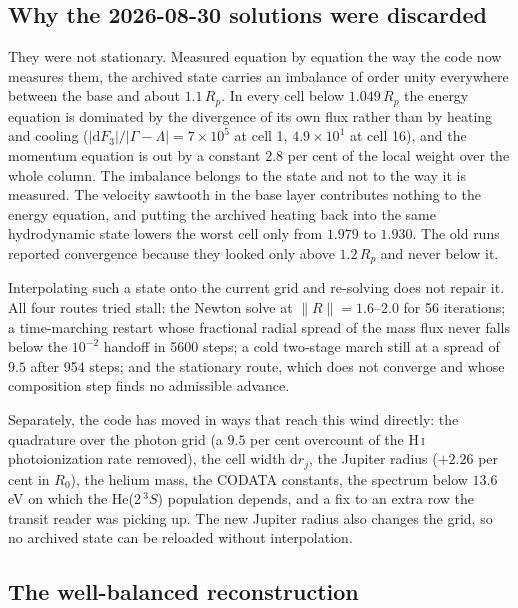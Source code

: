 \documentclass[english,a4paper]{my_memo}
\begin{document}
\subsection{Why the 2026-08-30 solutions were discarded}

They were not stationary. Measured equation by equation the way the code now
measures them, the archived state carries an imbalance of order unity
everywhere between the base and about $1.1\,R_p$. In every cell below
$1.049\,R_p$ the energy equation is dominated by the divergence of its own
flux rather than by heating and cooling ($|\mathrm{d}F_3|/|\Gamma - \Lambda|
= 7\times10^{5}$ at cell 1, $4.9\times10^{1}$ at cell 16), and the momentum
equation is out by a constant $2.8$ per cent of the local weight over the
whole column. The imbalance belongs to the state and not to the way it is
measured. The velocity sawtooth in the base layer contributes nothing to the
energy equation, and putting the archived heating back into the same
hydrodynamic state lowers the worst cell only from $1.979$ to $1.930$. The
old runs reported convergence because they looked only above $1.2\,R_p$ and
never below it.

Interpolating such a state onto the current grid and re-solving does not
repair it. All four routes tried stall: the Newton solve at
$\|R\| = 1.6$--$2.0$ for 56 iterations; a time-marching restart whose
fractional radial spread of the mass flux never falls below the $10^{-2}$
handoff in 5600 steps; a cold two-stage march still at a spread of $9.5$
after 954 steps; and the stationary route, which does not converge and whose
composition step finds no admissible advance.

Separately, the code has moved in ways that reach this wind directly: the
quadrature over the photon grid (a $9.5$ per cent overcount of the
H\,\textsc{i} photoionization rate removed), the cell width
$\mathrm{d}r_j$, the Jupiter radius ($+2.26$ per cent in $R_0$), the helium
mass, the CODATA constants, the spectrum below $13.6$\,eV on which the
He($2\,^3S$) population depends, and a fix to an extra row the transit reader
was picking up. The new Jupiter radius also changes the grid, so no archived
state can be reloaded without interpolation.

\subsection{The well-balanced reconstruction}
\end{document}
